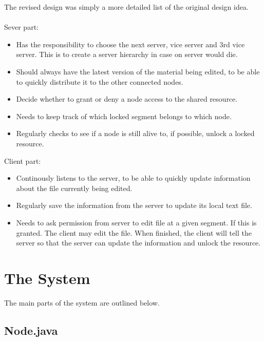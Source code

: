 \documentclass[12pt]{article}
\begin{document}
The revised design was simply a more detailed list of the original design idea.
\\\\
Sever part:
\begin{itemize}
\item Has the responsibility to choose the next server, vice server and 3rd vice server. This is to create a server hierarchy in case on server would die.
\item  Should always have the latest version of the material being edited, to be able to quickly distribute it to the other connected nodes.
\item Decide whether to grant or deny a node access to the shared resource.
\item Needs to keep track of which locked segment belongs to which node.
\item Regularly checks to see if a node is still alive to, if possible, unlock a locked resource.
\end{itemize}
Client part:
\begin{itemize}
\item Continously listens to the server, to be able to quickly update information about the file currently being edited. 
\item Regularly save the information from the server to update its local text file. 
\item Needs to ask permission from server to edit file at a given segment. If this is granted. The client may edit the file. When finished, the client will tell the server so that the server can update the information and unlock the resource.
\end{itemize}



\section{The System} %
\label{sec:the_system}
The main parts of the system are outlined below.

\subsection{Node.java} %
\label{sub:node_java}
\end{document}
